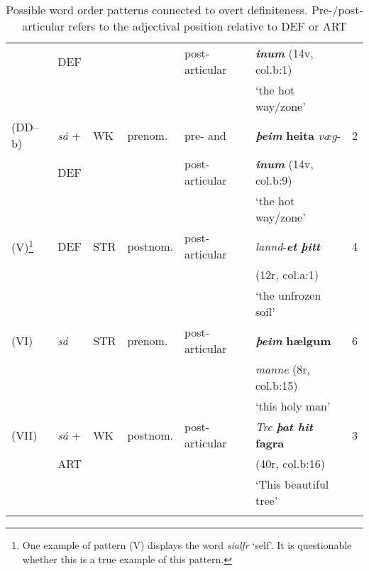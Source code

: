 \documentclass[output=paper,colorlinks,citecolor=brown]{langscibook}
\begin{document}
\begin{table}
\begin{tabular}{llllllr}
 & DEF &  &  & post-articular &\textbf{\textit{inum }} (14v, col.b:1)  &   \\ 
 &  &  &  &  &`the hot way/zone' &  \\ 
(DD--b) & \emph{sá} +  & WK & prenom. & pre- and & \textbf{\textit{þeim}} \textbf{heita} \textit{væg}- & 2 \\ 
&  DEF &  &  &  post-articular& \textit{\textbf{inum}} (14v, col.b:9)  &  \\ 
&   &  &  &  &  `the hot way/zone'  &  \\ 
(V)\footnote{One example of pattern (V) displays the word \emph{sialfr} `self'.
  It is questionable whether this is a true example of this pattern.} & DEF &  STR& postnom. &  post-articular& \textit{lannd}-\textit{\textbf{et} } \textbf{\textit{þitt}} &  4\\ 
  & & &  &  &  (12r, col.a:1) &  \\ 
  & & &  &  & `the unfrozen soil' &  \\ 
 (VI) & \emph{sá} & STR & prenom. & post-articular & \textit{\textbf{þeim}} \textbf{hælgum} & 6 \\
 &  &  &  &  & \textit{manne} (8r, col.b:15) \\
  &  & & &  &  `this holy man'  &  \\  
(VII) & \emph{sá} +  & WK & postnom. & post-articular & \textit{Tre} \textit{\textbf{þat hit}} \textbf{fagra} & 3 \\ 
 & ART & & &  &  (40r, col.b:16)  &  \\ 
 &  & & &  &  `This beautiful tree' &  \\
 \lspbottomrule
\end{tabular}
\caption{Possible word order patterns connected to overt definiteness. Pre-/post-articular refers to the adjectival position relative to DEF or ART}
\label{ch8t3}
\end{table}
\end{document}
